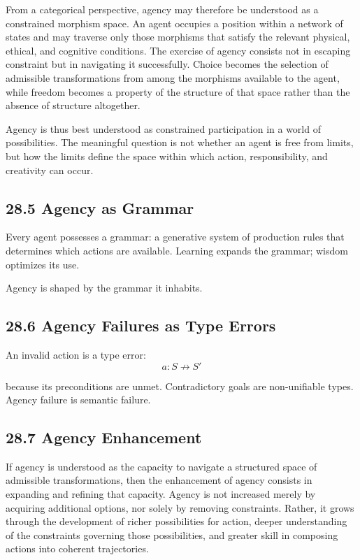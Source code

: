 \documentclass[12pt,letterpaper]{article}
\theoremstyle{remark}
\begin{document}
From a categorical perspective, agency may therefore be understood as a constrained morphism space. An agent occupies a position within a network of states and may traverse only those morphisms that satisfy the relevant physical, ethical, and cognitive conditions. The exercise of agency consists not in escaping constraint but in navigating it successfully. Choice becomes the selection of admissible transformations from among the morphisms available to the agent, while freedom becomes a property of the structure of that space rather than the absence of structure altogether.

Agency is thus best understood as constrained participation in a world of possibilities. The meaningful question is not whether an agent is free from limits, but how the limits define the space within which action, responsibility, and creativity can occur.

\subsection{28.5 Agency as Grammar}

Every agent possesses a grammar: a generative system of production rules that determines which actions are available. Learning expands the grammar; wisdom optimizes its use.

Agency is shaped by the grammar it inhabits.

\subsection{28.6 Agency Failures as Type Errors}

An invalid action is a type error:
\[
a : S \not\to S'
\]

because its preconditions are unmet. Contradictory goals are non-unifiable types. Agency failure is semantic failure.

\subsection{28.7 Agency Enhancement}

If agency is understood as the capacity to navigate a structured space of admissible transformations, then the enhancement of agency consists in expanding and refining that capacity. Agency is not increased merely by acquiring additional options, nor solely by removing constraints. Rather, it grows through the development of richer possibilities for action, deeper understanding of the constraints governing those possibilities, and greater skill in composing actions into coherent trajectories.
\end{document}
